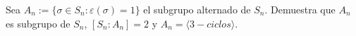 \question 
Sea $A_n := \{\sigma \in S_n: \varepsilon(\sigma)=1\}$ el subgrupo alternado de 
$S_n$. Demuestra que $A_n$ es subgrupo de $S_n$, $[S_n:A_n]=2$ y 
$A_n=\langle {3-ciclos} \rangle$. 